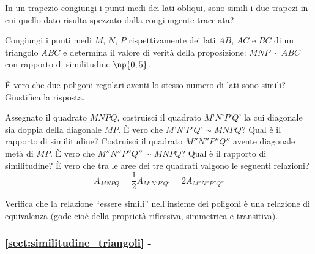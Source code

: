 \begin{multicols}{2}

\begin{esercizio}
\label{ese:6.51}
In un trapezio congiungi i punti medi dei lati obliqui, sono simili i 
due trapezi in cui quello dato risulta spezzato dalla congiungente 
tracciata? 
\end{esercizio}

\begin{esercizio}
\label{ese:6.52}
Congiungi i punti medi \(M\), \(N\), \(P\) rispettivamente dei lati \(AB\), 
\(AC\) e \(BC\) di un triangolo \(ABC\) e determina il valore di verità 
della proposizione: \(MNP\sim ABC\) con rapporto di similitudine 
\(\np{0,5}\).
\end{esercizio}

\begin{esercizio}
\label{ese:6.53}
È vero che due poligoni regolari aventi lo stesso numero di lati 
sono simili? Giustifica la risposta.
\end{esercizio}

\begin{esercizio}
\label{ese:6.54}
Assegnato il quadrato \(MNPQ\), costruisci il quadrato \(M’N’P’Q’\) la 
cui diagonale sia doppia della diagonale \(MP\). È vero che 
\(M’N’P’Q’\sim MNPQ\)? Qual è il rapporto di similitudine? Costruisci 
il quadrato \(M''N''P''Q''\) avente diagonale metà di \(MP\). È vero 
che \(M''N''P''Q''\sim MNPQ\)? Qual è il rapporto di similitudine? È 
vero che tra le aree dei tre quadrati valgono le seguenti relazioni?
\[A_{MNPQ}=\frac{1}{2}A_{M'N'P'Q'}=2A_{M''N''P''Q''} \]
\end{esercizio}

\begin{esercizio}
\label{ese:6.55}
Verifica che la relazione ``essere simili'' nell'insieme dei poligoni 
è una relazione di equivalenza (gode cioè della proprietà riflessiva, 
simmetrica e transitiva).
\end{esercizio}

\end{multicols}

\begingroup
\hypersetup{linkcolor=black}
\subsubsection*{\ref{sect:similitudine_triangoli} - 
}
\endgroup

